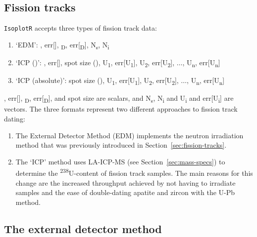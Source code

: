 \begin{refsection}

\chapter{Fission tracks}\label{ch:fissiontracks}

\texttt{IsoplotR} accepts three types of fission track data:

\begin{enumerate}
\item{`EDM':} \textzeta, err[\textzeta],
  \textrho\textsubscript{D}, err[\textrho\textsubscript{D}], 
  N\textsubscript{s}, N\textsubscript{i}
\item{`ICP (\textzeta)':} \textzeta, err[\textzeta], spot size
  (), U\textsubscript{1}, err[U\textsubscript{1}],
  U\textsubscript{2}, err[U\textsubscript{2}], $\ldots$,
  U\textsubscript{n}, err[U\textsubscript{n}]
\item{`ICP (absolute)':} spot size (), U\textsubscript{1},
  err[U\textsubscript{1}], U\textsubscript{2},
  err[U\textsubscript{2}], $\ldots$, U\textsubscript{n},
  err[U\textsubscript{n}]
\end{enumerate}

\noindent \textzeta, err[\textzeta], \textrho\textsubscript{D},
err[\textrho\textsubscript{D}], and spot size are scalars, and
N\textsubscript{s}, N\textsubscript{i} and U\textsubscript{i} and
err[U\textsubscript{i}] are vectors. The three formats represent two
different approaches to fission track dating:

\begin{enumerate}
\item The External Detector Method (EDM) implements the neutron
  irradiation method that was previously introduced in
  Section~\ref{sec:fission-tracks}.
\item The `ICP' method uses LA-ICP-MS (see
  Section~\ref{sec:mass-specs}) to determine the
  \textsuperscript{238}U-content of fission track samples.  The main
  reasons for this change are the increased throughput achieved by not
  having to irradiate samples and the ease of double-dating apatite
  and zircon with the U-Pb method.
\end{enumerate}

\section{The external detector method}
\label{sec:EDM}


\end{refsection}
